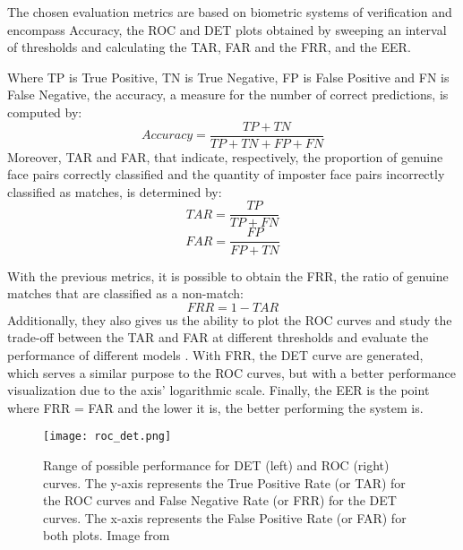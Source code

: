 \documentclass[class=report, crop=false, a4paper, 12pt]{standalone}
\begin{document}
\par The chosen evaluation metrics are based on biometric systems of verification and encompass Accuracy, the \gls{ROC} and \gls{DET} plots obtained by sweeping an interval of thresholds and calculating the \gls{TAR}, \gls{FAR} and the \gls{FRR}, and the \gls{EER}.

\par Where TP is True Positive, TN is True Negative, FP is False Positive and FN is False Negative, the accuracy, a measure for the number of correct predictions, is computed by: 
\begin{equation}
  Accuracy=\frac{TP+TN}{TP+TN+FP+FN}
\end{equation}
Moreover, TAR and FAR, that indicate, respectively, the proportion of genuine face pairs correctly classified and the quantity of imposter face pairs incorrectly classified as matches, is determined by: 
\begin{equation}
  TAR=\frac{TP}{TP+FN}
\end{equation}
\begin{equation}
  FAR=\frac{FP}{FP+TN}
\end{equation}


\par With the previous metrics, it is possible to obtain the FRR, the ratio of genuine matches that are classified as a non-match:
\begin{equation} 
  FRR = 1 - TAR
\end{equation}  
Additionally, they also gives us the ability to plot the ROC curves and study the trade-off between the TAR and FAR at different thresholds and evaluate the performance of different models . With FRR, the DET curve are generated, which serves a similar purpose to the ROC curves, but with a better performance visualization due to the axis' logarithmic scale. Finally, the EER is the point where FRR = FAR and the lower it is, the better performing the system is. 



\begin{figure}[H]
  \centering
  \texttt{[image: roc\_det.png]}
  \caption[Range of possible performance for DET and ROC curves .]{Range of possible performance for DET (left) and ROC (right) curves. The y-axis represents the True Positive Rate (or TAR) for the ROC curves and False Negative Rate (or FRR) for the DET curves. The x-axis represents the False Positive Rate (or FAR) for both plots. Image from~\autocite{saenz-lechonMethodologicalIssuesDevelopment2006}}
  \label{fig:roc_curve}
\end{figure}
\end{document}

